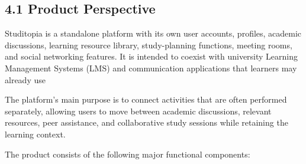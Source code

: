 \documentclass[12pt]{article}
\begin{document}
\subsection*{4.1 Product Perspective}
\par\medskip
Studitopia is a standalone platform with its own user accounts, profiles, academic discussions, learning resource library, study-planning functions, meeting rooms, and social networking features. It is intended to coexist with university Learning Management Systems (LMS) and communication applications that learners may already use
\par\medskip
The platform's main purpose is to connect activities that are often performed separately, allowing users to move between academic discussions, relevant resources, peer assistance, and collaborative study sessions while retaining the learning context.
\par\medskip
The product consists of the following major functional components:
\par\medskip
\end{document}
